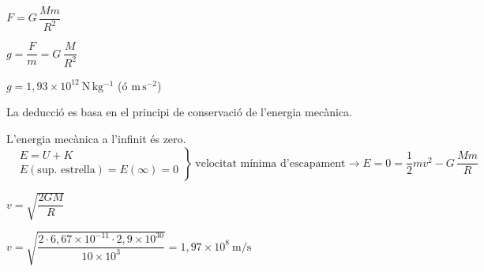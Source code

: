 \begin{solapartat}
 $F = G\,\dfrac{Mm}{R^2}$

 $g = \dfrac{F}{m} = G\,\dfrac{M}{R^2}$

 $g = 1,93\times 10^{12}\ \mathrm{N\,kg^{-1}}$ (ó $\mathrm{m\,s^{-2}}$)
\end{solapartat}

\begin{solapartat}
 La deducció es basa en el principi de conservació de l'energia mecànica.

 L'energia mecànica a l'infinit és zero.
\[ \left.\begin{aligned} &E = U + K\\ &E(\text{sup. estrella}) = E(\infty) = 0 \end{aligned}\right\}\ \text{velocitat mínima d'escapament} \rightarrow E = 0 = \frac{1}{2}mv^2 - G\,\frac{Mm}{R} \]

 $v = \sqrt{\dfrac{2GM}{R}}$

 $v = \sqrt{\dfrac{2\cdot 6,67\times 10^{-11}\cdot 2,9\times 10^{30}}{10\times 10^{3}}} = 1,97\times 10^{8}\ \mathrm{m/s}$
\end{solapartat}
